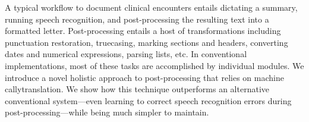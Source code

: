 A typical workflow to document clinical encounters entails dictating a summary, running speech recognition, and post-processing the resulting text into a formatted letter. Post-processing entails a host of transformations including punctuation restoration, truecasing, marking sections and headers, converting dates and numerical expressions, parsing lists, etc. In conventional implementations, most of these tasks are accomplished by individual modules. We introduce a novel holistic approach to post-processing that relies on machine callytranslation. We show how this technique outperforms an alternative conventional system—even learning to correct speech recognition errors during post-processing—while being much simpler to maintain.
